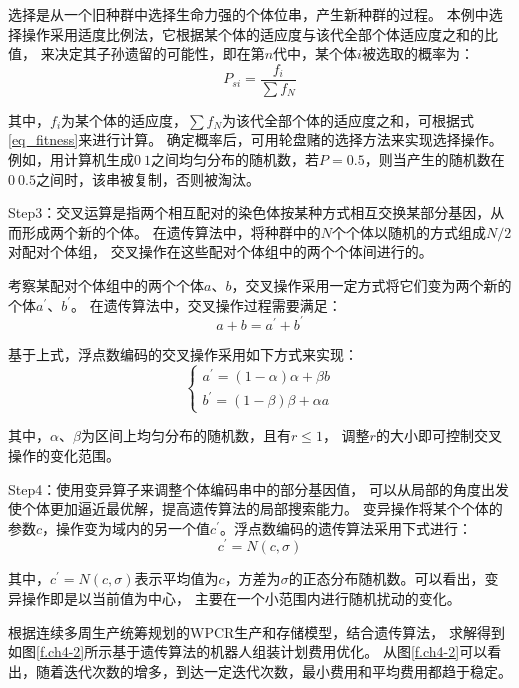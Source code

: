 选择是从一个旧种群中选择生命力强的个体位串，产生新种群的过程。
本例中选择操作采用适度比例法，它根据某个体的适应度与该代全部个体适应度之和的比值，
来决定其子孙遗留的可能性，即在第$n$代中，某个体$i$被选取的概率为：
\begin{equation}
    P_{si}=\frac{f_i}{\sum f_N}
\end{equation}

其中，$f_i$为某个体的适应度，$\sum f_N$为该代全部个体的适应度之和，可根据式\ref{eq_fitness}来进行计算。
确定概率后，可用轮盘赌的选择方法来实现选择操作。
例如，用计算机生成$0~1$之间均匀分布的随机数，若$P=0.5$，则当产生的随机数在$0~0.5$之间时，该串被复制，否则被淘汰。

Step3：交叉运算是指两个相互配对的染色体按某种方式相互交换某部分基因，从而形成两个新的个体。
在遗传算法中，将种群中的$N$个个体以随机的方式组成$N/2$对配对个体组，
交叉操作在这些配对个体组中的两个个体间进行的。

考察某配对个体组中的两个个体$a$、$b$，交叉操作采用一定方式将它们变为两个新的个体$a^{'}$、$b^{'}$。
在遗传算法中，交叉操作过程需要满足：
\begin{equation}
    a+b=a^{'}+b^{'}
\end{equation}

基于上式，浮点数编码的交叉操作采用如下方式来实现：
\begin{equation}
    \begin{cases}
        a^{'}=(1-\alpha)\alpha+\beta b \\
        b^{'}=(1-\beta)\beta+\alpha a
    \end{cases}
\end{equation}

其中，$\alpha$、$\beta$为区间上均匀分布的随机数，且有$r\leq1$，
调整$r$的大小即可控制交叉操作的变化范围。

Step4：使用变异算子来调整个体编码串中的部分基因值，
可以从局部的角度出发使个体更加逼近最优解，提高遗传算法的局部搜索能力。
变异操作将某个个体的参数$c$，操作变为域内的另一个值$c^{'}$。浮点数编码的遗传算法采用下式进行：
\begin{equation}
    c^{'}=N(c,\sigma)
\end{equation}

其中，$c^{'}=N(c,\sigma)$表示平均值为$c$，方差为$\sigma$的正态分布随机数。可以看出，变异操作即是以当前值为中心，
主要在一个小范围内进行随机扰动的变化。

根据连续多周生产统筹规划的WPCR生产和存储模型，结合遗传算法，
求解得到如图\ref{f.ch4-2}所示基于遗传算法的机器人组装计划费用优化。
从图\ref{f.ch4-2}可以看出，随着迭代次数的增多，到达一定迭代次数，最小费用和平均费用都趋于稳定。

